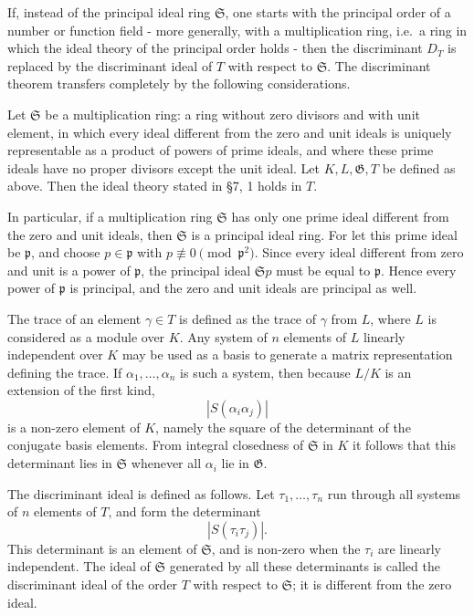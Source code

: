 \documentclass[11pt]{article}
\begin{document}
If, instead of the principal ideal ring \(\mathfrak S\), one starts with
the principal order of a number or function field - more generally, with
a multiplication ring, i.e.~a ring in which the ideal theory of the
principal order holds - then the discriminant \(D_T\) is replaced by the
discriminant ideal of \(T\) with respect to \(\mathfrak S\). The
discriminant theorem transfers completely by the following
considerations.

Let \(\mathfrak S\) be a multiplication ring: a ring without zero
divisors and with unit element, in which every ideal different from the
zero and unit ideals is uniquely representable as a product of powers of
prime ideals, and where these prime ideals have no proper divisors
except the unit ideal. Let \(K,L,\mathfrak G,T\) be defined as above.
Then the ideal theory stated in §7, 1 holds in \(T\).

In particular, if a multiplication ring \(\mathfrak S\) has only one
prime ideal different from the zero and unit ideals, then
\(\mathfrak S\) is a principal ideal ring. For let this prime ideal be
\(\mathfrak p\), and choose \(p\in\mathfrak p\) with
\(p\not\equiv0\pmod{\mathfrak p^2}\). Since every ideal different from
zero and unit is a power of \(\mathfrak p\), the principal ideal
\(\mathfrak S p\) must be equal to \(\mathfrak p\). Hence every power of
\(\mathfrak p\) is principal, and the zero and unit ideals are principal
as well.

The trace of an element \(\gamma\in T\) is defined as the trace of
\(\gamma\) from \(L\), where \(L\) is considered as a module over \(K\).
Any system of \(n\) elements of \(L\) linearly independent over \(K\)
may be used as a basis to generate a matrix representation defining the
trace. If \(\alpha_1,
\ldots,
\alpha_n\) is such a system, then because \(L/K\) is an extension of the
first kind, \[
  |S(\alpha_i\alpha_j)|
\] is a non-zero element of \(K\), namely the square of the determinant
of the conjugate basis elements. From integral closedness of
\(\mathfrak S\) in \(K\) it follows that this determinant lies in
\(\mathfrak S\) whenever all \(\alpha_i\) lie in \(\mathfrak G\).

The discriminant ideal is defined as follows. Let \(\tau_1,
\ldots,
\tau_n\) run through all systems of \(n\) elements of \(T\), and form
the determinant \[
  |S(\tau_i\tau_j)|.
\] This determinant is an element of \(\mathfrak S\), and is non-zero
when the \(\tau_i\) are linearly independent. The ideal of
\(\mathfrak S\) generated by all these determinants is called the
discriminant ideal of the order \(T\) with respect to \(\mathfrak S\);
it is different from the zero ideal.
\end{document}
